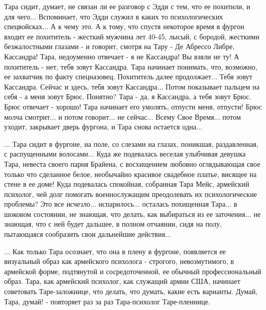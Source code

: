 Тара сидит, думает, не связан ли ее разговор с Эдди с тем, что ее похитили, и
для чего...  Вспоминает, что Эдди служил в каких то психологических
спецвойсках...  А к чему это. А к тому, что спустя некоторое время в фургон
входит ее похититель - жесткий мужчина лет 40-45, лысый, с бородой, жесткими
безжалостными глазами - и говорит, смотря на Тару - Де Абрессо Либре,
Кассандра!  Тара, недоуменно отвечает - я не Кассандра! Вы взяли не ту! А
похититель - нет, тебя зовут Кассандра.  Тара начинает понимать, что, возможно,
ее захватчик по факту спецназовец. Похититель далее продолжает...  Тебя зовут
Кассандра. Сейчас и здесь, тебя зовут Кассандра... Потом показывает пальцем на
себя - а меня зовут Брюс.  Понятно? Тара - да, я Кассандра, а тебя зовут Брюс.
Брюс отвечает - хорошо! Тара начинает его умолять, отпусти меня, отпусти! Брюс
молча смотрит... и потом говорит... не сейчас... Всему Свое Время... потом
уходит, закрывает дверь фургона, и Тара снова остается одна...

... Тара сидит в фургоне, на поле, со слезами на глазах, поникшая,
раздавленная, с распущенными волосами... Куда же подевалась веселая улыбчивая
девушка Тара, невеста своего парня Брайена, с восхищением любовно оглядывающая
свое только что сделанное белое, необычайно красивое свадебное платье, висящее
на стене в ее доме! Куда подевалась спокойная, собранная Тара Мейс, армейский
психолог, чей долг помогать военнослужащим преодолевать их психологические
проблемы? Это все исчезло... испарилось...  осталась похищенная Тара... в
шоковом состоянии, не знающая, что делать, как выбираться из ее заточения...
не знающая, что с ней будет дальшее, в полном отчаянии, сидя на полу,
пытающаяся сообразить свои дальнейшие действия... 

... Как только Тара осознает, что она в плену в фургоне, появляется ее
визуальный образ как армейского психолога - строгого, невозмутимого, в
армейской форме, подтянутой и сосредоточенной, ее обычный профессиональный
образ. Тара, как армейский психолог, как служащий армии США, начинает
советовать Таре-заложнице, что делать, что думать, какие есть варианты. Думай,
Тара, думай! - повторяет раз за раз Тара-психолог Таре-пленнице. 






